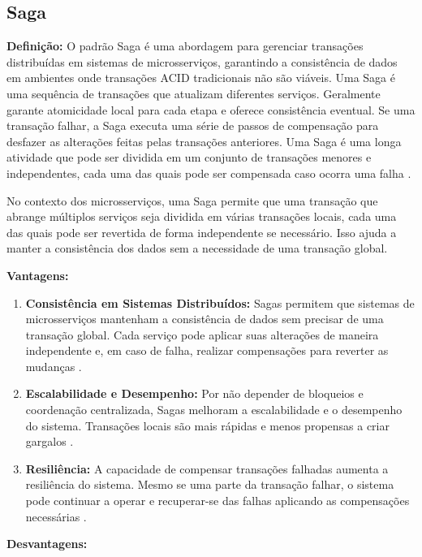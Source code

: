\subsection{Saga}

\textbf{Definição:} O padrão Saga é uma abordagem para gerenciar transações distribuídas em sistemas de microsserviços, garantindo a consistência de dados em ambientes onde transações ACID tradicionais não são viáveis. Uma Saga é uma sequência de transações que atualizam diferentes serviços. Geralmente garante atomicidade local para cada etapa e oferece consistência eventual. Se uma transação falhar, a Saga executa uma série de passos de compensação para desfazer as alterações feitas pelas transações anteriores. Uma Saga é uma longa atividade que pode ser dividida em um conjunto de transações menores e independentes, cada uma das quais pode ser compensada caso ocorra uma falha \cite{garcia-molina1987}.

No contexto dos microsserviços, uma Saga permite que uma transação que abrange múltiplos serviços seja dividida em várias transações locais, cada uma das quais pode ser revertida de forma independente se necessário. Isso ajuda a manter a consistência dos dados sem a necessidade de uma transação global.

\textbf{Vantagens:}

\begin{enumerate}
    \item \textbf{Consistência em Sistemas Distribuídos:} Sagas permitem que sistemas de microsserviços mantenham a consistência de dados sem precisar de uma transação global. Cada serviço pode aplicar suas alterações de maneira independente e, em caso de falha, realizar compensações para reverter as mudanças \cite{richardson2018}.
    \item \textbf{Escalabilidade e Desempenho:} Por não depender de bloqueios e coordenação centralizada, Sagas melhoram a escalabilidade e o desempenho do sistema. Transações locais são mais rápidas e menos propensas a criar gargalos \cite{fowler2011}.
    \item \textbf{Resiliência:} A capacidade de compensar transações falhadas aumenta a resiliência do sistema. Mesmo se uma parte da transação falhar, o sistema pode continuar a operar e recuperar-se das falhas aplicando as compensações necessárias \cite{garcia-molina1987}.
\end{enumerate}

\textbf{Desvantagens:}

